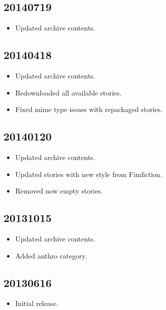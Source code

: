 \documentclass[hidelinks,a4paper,12pt]{article}
\begin{document}
\subsection{20140719} \label{sec:changelog_20140719}

\begin{itemize}
\item Updated archive contents.
\end{itemize}

\subsection{20140418} \label{sec:changelog_20140418}

\begin{itemize}
\item Updated archive contents.
\item Redownloaded all available stories.
\item Fixed mime type issues with repackaged stories.
\end{itemize}

\subsection{20140120} \label{sec:changelog_20140120}

\begin{itemize}
\item Updated archive contents.
\item Updated stories with new style from Fimfiction.
\item Removed now empty stories.
\end{itemize}

\subsection{20131015} \label{sec:changelog_20131015}

\begin{itemize}
\item Updated archive contents.
\item Added anthro category.
\end{itemize}

\subsection{20130616} \label{sec:changelog_20130616}

\begin{itemize}
\item Initial release.
\end{itemize}
\end{document}
